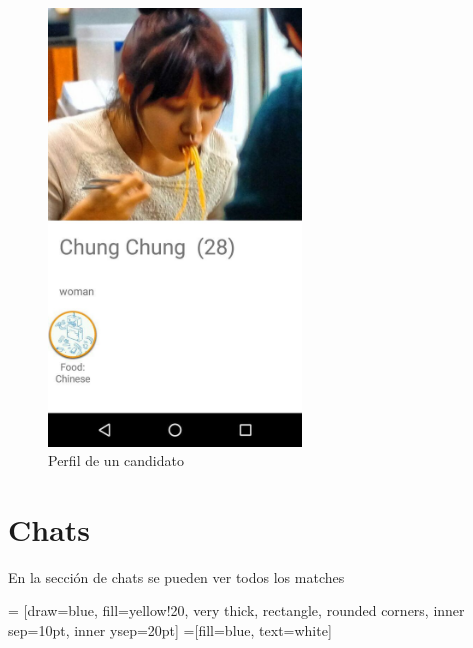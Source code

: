 \documentclass[10pt,letterpaper,extrafontsizes]{memoir}
\begin{document}
\begin{figure}[H]
    \centering
\includegraphics[width=0.6\textwidth]{graficos/capturas/z}
    \caption{Perfil de un candidato}
    \label{fig:perfmatch}
\end{figure}

\chapter{Chats}\label{cap:chat}

En la sección de chats se pueden ver todos los matches 

\begin{center}
 = [draw=blue, fill=yellow!20, very thick,
    rectangle, rounded corners, inner sep=10pt, inner ysep=20pt]
 =[fill=blue, text=white]
\end{center}
%
\end{document}
